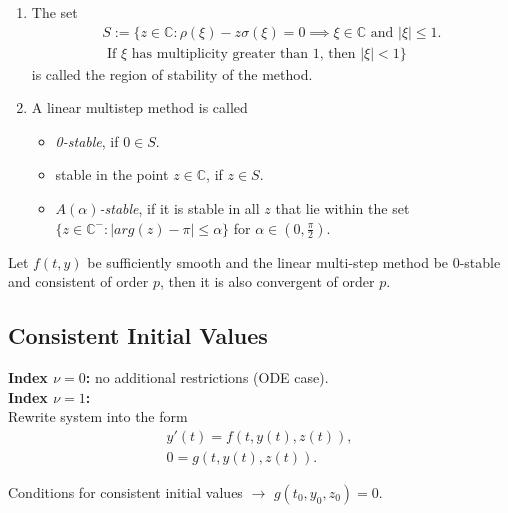 	\begin{frame}
		\vfill
			\begin{definition}
			\begin{enumerate}
				\item 
				The set
				\begin{equation}
					\begin{aligned}
						S := \{z \in \mathbb{C} : \rho(\xi) - z \sigma(\xi) = 0 \implies \xi \in \mathbb{C} \text{ and } |\xi| \leq 1. \\
						\text{ If $\xi$ has multiplicity greater than $1$, then } |\xi| < 1\}
					\end{aligned}
				\end{equation}
				is called the region of stability of the method.
				\item 
				A linear multistep method is called
				\begin{itemize}
					\item \emph{0-stable}, if $0 \in S$.
					\item stable in the point $z \in \mathbb{C}$, if $z \in S$.
					\item \emph{$A(\alpha)$-stable}, if it is stable in all $z$ that lie within the set $\{z \in \mathbb{C}^- : |arg(z)-\pi| \leq \alpha\}$ for $\alpha \in (0, \frac{\pi}{2})$.		 
				\end{itemize}
			\end{enumerate}
		\end{definition}
		\vfill
	\end{frame}
	
	\begin{frame}
		\vfill
		\begin{theorem}%
			\label{th: null-stbaility and consistence is convergence}
			Let $f(t,y)$ be sufficiently smooth and the linear multi-step method be 0-stable and consistent of order $p$, then it is also convergent of order $p$.
		\end{theorem}
		\vfill
	\end{frame}
	
	\subsection{Consistent Initial Values}
	\begin{frame}
		\vfill
		\textbf{Index $\nu = 0$:} no additional restrictions (ODE case).\\ 
		
		\textbf{Index $\nu = 1$:}\\
		
		Rewrite system into the form
		\begin{align*}
			y'(t) = f(t,y(t),z(t)), \\
			0 = g(t,y(t),z(t)).
		\end{align*}
		
		Conditions for consistent initial values $\to$ $g(t_0, y_0, z_0) = 0$.
		\vfill
	\end{frame}
	
